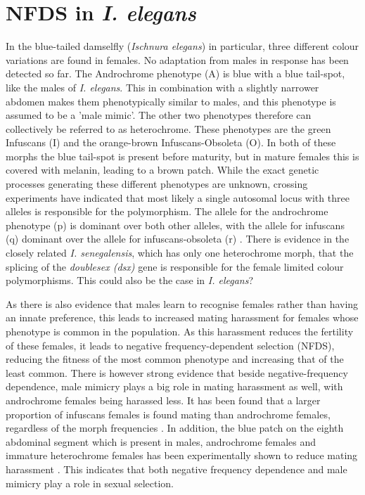 \documentclass{article}
\begin{document}
\section{NFDS in \textit{I. elegans}}
In the blue-tailed damselfly (\textit{Ischnura elegans}) in particular, three different colour variations are found in females. No adaptation from males in response has been detected so far. The Androchrome phenotype (A) is blue with a blue tail-spot, like the males of \textit{I. elegans}. This in combination with a slightly narrower abdomen makes them phenotypically similar to males, and this phenotype is assumed to be a 'male mimic'. The other two phenotypes therefore can collectively be referred to as heterochrome. These phenotypes are the green Infuscans (I) and the orange-brown Infuscans-Obsoleta (O). In both of these morphs the blue tail-spot is present before maturity, but in mature females this is covered with melanin, leading to a brown patch. While the exact genetic processes generating these different phenotypes are unknown, crossing experiments have indicated that most likely a single autosomal locus with three alleles is responsible for the polymorphism\cite{Cordero1990}. The allele for the androchrome phenotype (p) is dominant over both other alleles, with the allele for infuscans (q) dominant over the allele for infuscans-obsoleta (r) \cite{Cordero1990}. There is evidence in the closely related \textit{I. senegalensis}, which has only one heterochrome morph, that the splicing of the \textit{doublesex (dsx)} gene is responsible for the female limited colour polymorphisms. This could also be the case in \textit{I. elegans}?

As there is also evidence that males learn to recognise females rather than having an innate preference, this leads to increased mating harassment for females whose phenotype is common in the population. As this harassment reduces the fertility of these females, it leads to negative frequency-dependent selection (NFDS), reducing the fitness of the most common phenotype and increasing that of the least common.
There is however strong evidence that beside negative-frequency dependence, male mimicry plays a big role in mating harassment as well, with androchrome females being harassed less. It has been found that a larger proportion of infuscans females is found mating than androchrome females, regardless of the morph frequencies \cite{Gosden2009}. In addition, the blue patch on the eighth abdominal segment which is present in males, androchrome females and immature heterochrome females has been experimentally shown to reduce mating harassment \cite{Willink2019}. This indicates that both negative frequency dependence and male mimicry play a role in sexual selection.
\end{document}
